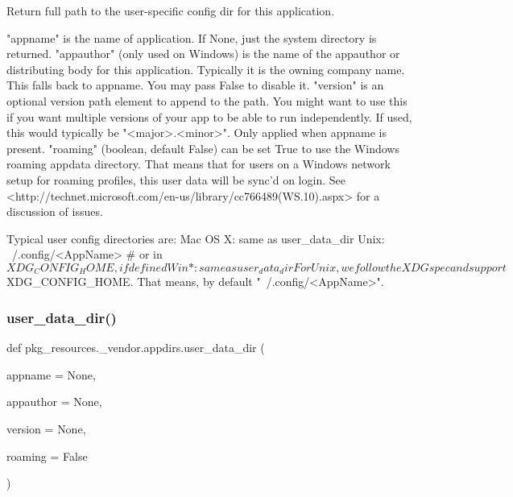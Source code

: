\begin{DoxyVerb}Return full path to the user-specific config dir for this application.

    "appname" is the name of application.
        If None, just the system directory is returned.
    "appauthor" (only used on Windows) is the name of the
        appauthor or distributing body for this application. Typically
        it is the owning company name. This falls back to appname. You may
        pass False to disable it.
    "version" is an optional version path element to append to the
        path. You might want to use this if you want multiple versions
        of your app to be able to run independently. If used, this
        would typically be "<major>.<minor>".
        Only applied when appname is present.
    "roaming" (boolean, default False) can be set True to use the Windows
        roaming appdata directory. That means that for users on a Windows
        network setup for roaming profiles, this user data will be
        sync'd on login. See
        <http://technet.microsoft.com/en-us/library/cc766489(WS.10).aspx>
        for a discussion of issues.

Typical user config directories are:
    Mac OS X:               same as user_data_dir
    Unix:                   ~/.config/<AppName>     # or in $XDG_CONFIG_HOME, if defined
    Win *:                  same as user_data_dir

For Unix, we follow the XDG spec and support $XDG_CONFIG_HOME.
That means, by default "~/.config/<AppName>".
\end{DoxyVerb}
 \mbox{\label{namespacepkg__resources_1_1__vendor_1_1appdirs_a3b03c46f6524b886b726517c7f76dad4}} 
\subsubsection{\texorpdfstring{user\+\_\+data\+\_\+dir()}{user\_data\_dir()}}
{\footnotesize\ttfamily def pkg\+\_\+resources.\+\_\+vendor.\+appdirs.\+user\+\_\+data\+\_\+dir (\begin{DoxyParamCaption}\item[{}]{appname = {\ttfamily None},  }\item[{}]{appauthor = {\ttfamily None},  }\item[{}]{version = {\ttfamily None},  }\item[{}]{roaming = {\ttfamily False} }\end{DoxyParamCaption})}

